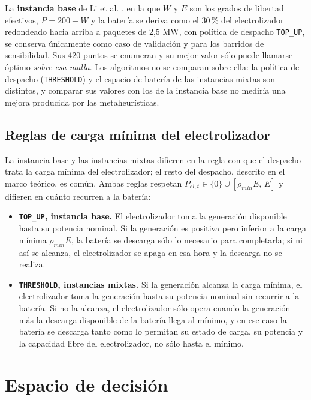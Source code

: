 La \textbf{instancia base} de Li et al. \cite{Li2024WPEB}, en la que $W$ y $E$ son los grados de libertad efectivos, $P=200-W$ y la batería se deriva como el 30\,\% del electrolizador redondeado hacia arriba a paquetes de 2,5 MW, con política de despacho \texttt{TOP\_UP}, se conserva únicamente como caso de validación y para los barridos de sensibilidad. Sus 420 puntos se enumeran y su mejor valor sólo puede llamarse óptimo \emph{sobre esa malla}. Los algoritmos no se comparan sobre ella: la política de despacho (\texttt{THRESHOLD}) y el espacio de batería de las instancias mixtas son distintos, y comparar sus valores con los de la instancia base no mediría una mejora producida por las metaheurísticas.

\subsection{Reglas de carga mínima del electrolizador}
\label{sec:politicas_despacho}

La instancia base y las instancias mixtas difieren en la regla con que el despacho trata la carga mínima del electrolizador; el resto del despacho, descrito en el marco teórico, es común. Ambas reglas respetan $P_{el,t}\in\{0\}\cup[\rho_{min}E,\,E]$ y difieren en cuánto recurren a la batería:

\begin{itemize}
    \item \textbf{\texttt{TOP\_UP}, instancia base.} El electrolizador toma la generación disponible hasta su potencia nominal. Si la generación es positiva pero inferior a la carga mínima $\rho_{min}E$, la batería se descarga sólo lo necesario para completarla; si ni así se alcanza, el electrolizador se apaga en esa hora y la descarga no se realiza.
    \item \textbf{\texttt{THRESHOLD}, instancias mixtas.} Si la generación alcanza la carga mínima, el electrolizador toma la generación hasta su potencia nominal sin recurrir a la batería. Si no la alcanza, el electrolizador sólo opera cuando la generación más la descarga disponible de la batería llega al mínimo, y en ese caso la batería se descarga tanto como lo permitan su estado de carga, su potencia y la capacidad libre del electrolizador, no sólo hasta el mínimo.
\end{itemize}

\section{Espacio de decisión}

